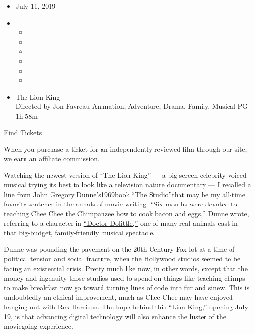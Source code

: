 \begin{itemize}
\item
  July 11, 2019
\item
  \begin{itemize}
  \item
  \item
  \item
  \item
  \item
  \item
  \end{itemize}
\end{itemize}

\begin{itemize}
\tightlist
\item
  The Lion King\\
  Directed by Jon Favreau Animation, Adventure, Drama, Family, Musical
  PG 1h 58m
\end{itemize}

\href{https://www.imdb.com/showtimes/title/tt6105098?ref_=ref_ext_NYT}{Find
Tickets}

When you purchase a ticket for an independently reviewed film through
our site, we earn an affiliate commission.

Watching the newest version of ``The Lion King'' --- a big-screen
celebrity-voiced musical trying its best to look like a television
nature documentary --- I recalled a line from
\href{https://www.goodreads.com/book/show/137365.The_Studio}{John
Gregory
Dunne's}\href{https://www.goodreads.com/book/show/137365.The_Studio}{1969}\href{https://www.goodreads.com/book/show/137365.The_Studio}{book
``The Studio''}that may be my all-time favorite sentence in the annals
of movie writing. ``Six months were devoted to teaching Chee Chee the
Chimpanzee how to cook bacon and eggs,'' Dunne wrote, referring to a
character in \href{https://www.youtube.com/watch?v=49CmzIRX1k0}{``Doctor
Dolittle,''} one of many real animals cast in that big-budget,
family-friendly musical spectacle.

Dunne was pounding the pavement on the 20th Century Fox lot at a time of
political tension and social fracture, when the Hollywood studios seemed
to be facing an existential crisis. Pretty much like now, in other
words, except that the money and ingenuity those studios used to spend
on things like teaching chimps to make breakfast now go toward turning
lines of code into fur and sinew. This is undoubtedly an ethical
improvement, much as Chee Chee may have enjoyed hanging out with Rex
Harrison. The hope behind this ``Lion King,'' opening July 19, is that
advancing digital technology will also enhance the luster of the
moviegoing experience.

